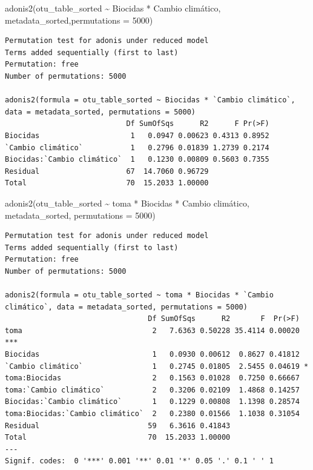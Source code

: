 \documentclass[
  letterpaper,
  DIV=11,
  numbers=noendperiod]{scrartcl}
\newenvironment{Shaded}{\begin{snugshade}}{\end{snugshade}}
\newcommand{\AttributeTok}[1]{\textcolor[rgb]{0.40,0.45,0.13}{#1}}
\newcommand{\DecValTok}[1]{\textcolor[rgb]{0.68,0.00,0.00}{#1}}
\newcommand{\FunctionTok}[1]{\textcolor[rgb]{0.28,0.35,0.67}{#1}}
\newcommand{\NormalTok}[1]{\textcolor[rgb]{0.00,0.23,0.31}{#1}}
\newcommand{\SpecialCharTok}[1]{\textcolor[rgb]{0.37,0.37,0.37}{#1}}
\newcommand{\StringTok}[1]{\textcolor[rgb]{0.13,0.47,0.30}{#1}}
\begin{document}
\begin{Shaded}
\begin{Highlighting}[]
\FunctionTok{adonis2}\NormalTok{(otu\_table\_sorted }\SpecialCharTok{\textasciitilde{}}\NormalTok{ Biocidas }\SpecialCharTok{*} \StringTok{\textasciigrave{}}\AttributeTok{Cambio climático}\StringTok{\textasciigrave{}}\NormalTok{, metadata\_sorted,}\AttributeTok{permutations =} \DecValTok{5000}\NormalTok{)}
\end{Highlighting}
\end{Shaded}

\begin{verbatim}
Permutation test for adonis under reduced model
Terms added sequentially (first to last)
Permutation: free
Number of permutations: 5000

adonis2(formula = otu_table_sorted ~ Biocidas * `Cambio climático`, data = metadata_sorted, permutations = 5000)
                            Df SumOfSqs      R2      F Pr(>F)
Biocidas                     1   0.0947 0.00623 0.4313 0.8952
`Cambio climático`           1   0.2796 0.01839 1.2739 0.2174
Biocidas:`Cambio climático`  1   0.1230 0.00809 0.5603 0.7355
Residual                    67  14.7060 0.96729              
Total                       70  15.2033 1.00000              
\end{verbatim}

\begin{Shaded}
\begin{Highlighting}[]
\FunctionTok{adonis2}\NormalTok{(otu\_table\_sorted }\SpecialCharTok{\textasciitilde{}}\NormalTok{ toma }\SpecialCharTok{*}\NormalTok{ Biocidas }\SpecialCharTok{*} \StringTok{\textasciigrave{}}\AttributeTok{Cambio climático}\StringTok{\textasciigrave{}}\NormalTok{, metadata\_sorted, }\AttributeTok{permutations =} \DecValTok{5000}\NormalTok{)}
\end{Highlighting}
\end{Shaded}

\begin{verbatim}
Permutation test for adonis under reduced model
Terms added sequentially (first to last)
Permutation: free
Number of permutations: 5000

adonis2(formula = otu_table_sorted ~ toma * Biocidas * `Cambio climático`, data = metadata_sorted, permutations = 5000)
                                 Df SumOfSqs      R2       F  Pr(>F)    
toma                              2   7.6363 0.50228 35.4114 0.00020 ***
Biocidas                          1   0.0930 0.00612  0.8627 0.41812    
`Cambio climático`                1   0.2745 0.01805  2.5455 0.04619 *  
toma:Biocidas                     2   0.1563 0.01028  0.7250 0.66667    
toma:`Cambio climático`           2   0.3206 0.02109  1.4868 0.14257    
Biocidas:`Cambio climático`       1   0.1229 0.00808  1.1398 0.28574    
toma:Biocidas:`Cambio climático`  2   0.2380 0.01566  1.1038 0.31054    
Residual                         59   6.3616 0.41843                    
Total                            70  15.2033 1.00000                    
---
Signif. codes:  0 '***' 0.001 '**' 0.01 '*' 0.05 '.' 0.1 ' ' 1
\end{verbatim}
\end{document}
